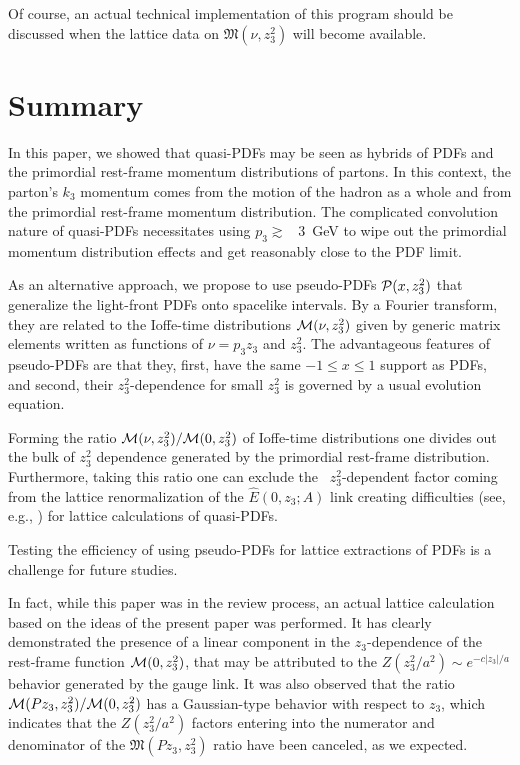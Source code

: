 \documentclass[aps,prd,twocolumn,showpacs,preprintnumbers,superscriptaddress,groupedaddress]{revtex4-1}
\begin{document}
Of course, an actual technical  implementation of this program 
should be discussed when the lattice data on ${\mathfrak M} (\nu, z_3^2)$
will become  available.
















\section{Summary}

In this paper, we  showed that  quasi-PDFs may be  seen  as hybrids of PDFs and the 
primordial rest-frame 
momentum distributions of partons. 
In this context,  the parton's $k_3$ momentum
comes from the motion
of the hadron as a whole and from  the primordial 
 rest-frame 
 momentum distribution.    The  complicated convolution  nature of quasi-PDFs 
necessitates  using  $p_3 \gtrsim $ \mbox{ 3 GeV}  to wipe out
the primordial momentum distribution effects and 
 get reasonably close to the PDF limit.
 
As an alternative approach, we propose   to use 
pseudo-PDFs  $ {\cal P} (x, z_3^2)  $ that generalize
the light-front PDFs   onto spacelike intervals.   By a  Fourier transform,
they are related to the 
 Ioffe-time  distributions  ${\cal M} (\nu, z_3^2) $  given by  generic matrix elements  
 written as  functions of $\nu = p_3 z_3$ and $z_3^2$. 
 The advantageous features  of  pseudo-PDFs  are  that they, first,  have the 
 same $-1 \leq x  \leq 1$ support  as PDFs, and second, their 
 $z_3^2$-dependence  for small $z_3^2$  is governed by  a usual  evolution equation.
 
 Forming   the ratio ${\cal M} (\nu, z_3^2)/{\cal M} (0, z_3^2)$  
 of  Ioffe-time  distributions  one 
 divides   out the bulk of $z_3^2$   dependence generated by  
 the primordial rest-frame distribution. 
 Furthermore,  taking this ratio 
 one can exclude the \mbox{ $z_3^2$-dependent}   factor coming from the 
 lattice renormalization of the $\hat E (0,z_3;A)$ link 
creating    difficulties (see, e.g.,  \cite{Ishikawa:2016znu}) for   lattice calculations of quasi-PDFs. 

Testing the efficiency of using pseudo-PDFs for  lattice extractions 
of PDFs is a  challenge for future studies.  

In fact, while this paper was in the review
process, an actual lattice calculation  \cite{Orginos:2017kos} based on the ideas of  
 the present  paper was performed.
 It  has clearly demonstrated  the presence of a linear  component in the $z_3$-dependence 
    of  the rest-frame function ${\cal M} (0,z_3^2)$, that may be attributed 
    to the $Z(z_3^2/a^2) \sim e^{-c|z_3|/a}$ behavior 
    generated by the gauge link. It was also observed that 
      the ratio ${\cal M} (Pz_3 , z_3^2)/{\cal M} (0, z_3^2)$
    has a Gaussian-type  behavior with respect to $z_3$, which indicates that 
    the $Z(z_3^2/a^2)$ factors entering into the numerator and denominator
    of the ${\mathfrak  M} (Pz_3, z_3^2)$  ratio have been canceled, as we expected.
\end{document}
